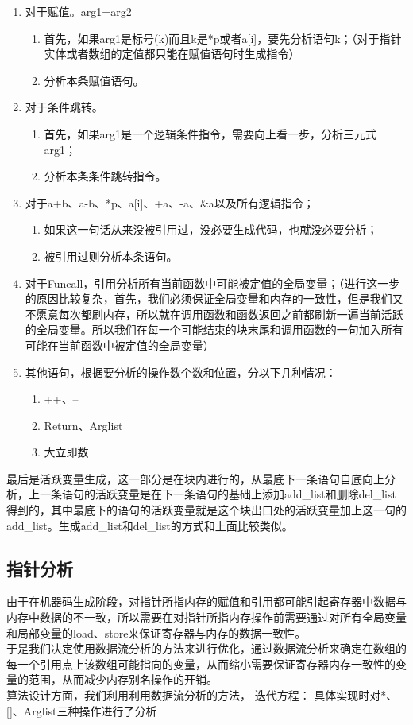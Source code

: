 \documentclass[12pt,a4paper,Flow]{report}
\begin{document}
\begin{enumerate}
\item 对于赋值。arg1=arg2
\begin{enumerate}
\item 首先，如果arg1是标号(k)而且k是*p或者a[i]，要先分析语句k；（对于指针实体或者数组的定值都只能在赋值语句时生成指令）
\item 分析本条赋值语句。
\end{enumerate}
\item 对于条件跳转。
\begin{enumerate}
\item 首先，如果arg1是一个逻辑条件指令，需要向上看一步，分析三元式arg1；
\item 分析本条条件跳转指令。
\end{enumerate}
\item 对于a+b、a-b、*p、a[i]、+a、-a、\&a以及所有逻辑指令；
\begin{enumerate}
\item 如果这一句话从来没被引用过，没必要生成代码，也就没必要分析；
\item 被引用过则分析本条语句。
\end{enumerate}
\item 对于Funcall，引用分析所有当前函数中可能被定值的全局变量；（进行这一步的原因比较复杂，首先，我们必须保证全局变量和内存的一致性，但是我们又不愿意每次都刷内存，所以就在调用函数和函数返回之前都刷新一遍当前活跃的全局变量。所以我们在每一个可能结束的块末尾和调用函数的一句加入所有可能在当前函数中被定值的全局变量）
\item 其他语句，根据要分析的操作数个数和位置，分以下几种情况：
\begin{enumerate}
\item ++、--
\item Return、Arglist
\item 大立即数
\end{enumerate}
\end{enumerate}
最后是活跃变量生成，这一部分是在块内进行的，从最底下一条语句自底向上分析，上一条语句的活跃变量是在下一条语句的基础上添加add\_list和删除del\_list得到的，其中最底下的语句的活跃变量就是这个块出口处的活跃变量加上这一句的add\_list。生成add\_list和del\_list的方式和上面比较类似。\\
\subsection{指针分析}
由于在机器码生成阶段，对指针所指内存的赋值和引用都可能引起寄存器中数据与内存中数据的不一致，所以需要在对指针所指内存操作前需要通过对所有全局变量和局部变量的load、store来保证寄存器与内存的数据一致性。\\
\indent 于是我们决定使用数据流分析的方法来进行优化，通过数据流分析来确定在数组的每一个引用点上该数组可能指向的变量，从而缩小需要保证寄存器内存一致性的变量的范围，从而减少内存别名操作的开销。\\
\indent 算法设计方面，我们利用利用数据流分析的方法，
	迭代方程：
具体实现时对*、[]、Arglist三种操作进行了分析
\end{document}
